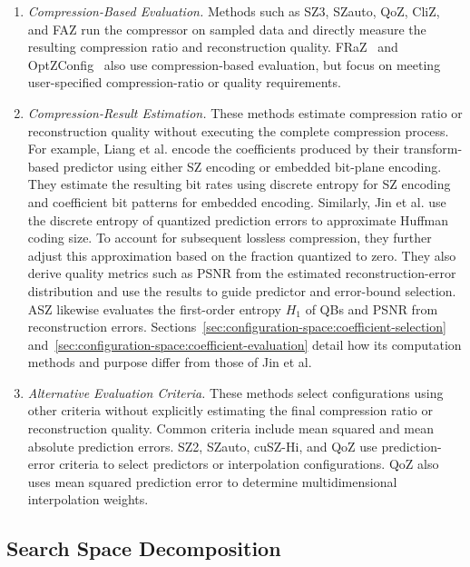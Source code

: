 \begin{enumerate}
\item \emph{Compression-Based Evaluation.} Methods such as SZ3, SZauto, QoZ, CliZ, and FAZ run the compressor on sampled data and directly measure the resulting compression ratio and reconstruction quality. FRaZ~\cite{underwood2020fraz} and OptZConfig~\cite{underwood2022optzconfig} also use compression-based evaluation, but focus on meeting user-specified compression-ratio or quality requirements.

\item \emph{Compression-Result Estimation.} These methods estimate compression ratio or reconstruction quality without executing the complete compression process. For example, Liang et al. encode the coefficients produced by their transform-based predictor using either SZ encoding or embedded bit-plane encoding. They estimate the resulting bit rates using discrete entropy for SZ encoding and coefficient bit patterns for embedded encoding. Similarly, Jin et al. use the discrete entropy of quantized prediction errors to approximate Huffman coding size. To account for subsequent lossless compression, they further adjust this approximation based on the fraction quantized to zero. They also derive quality metrics such as PSNR from the estimated reconstruction-error distribution and use the results to guide predictor and error-bound selection. ASZ likewise evaluates the first-order entropy $H_1$ of QBs and PSNR from reconstruction errors. Sections~\ref{sec:configuration-space:coefficient-selection} and~\ref{sec:configuration-space:coefficient-evaluation} detail how its computation methods and purpose differ from those of Jin et al.

\item \emph{Alternative Evaluation Criteria.} These methods select configurations using other criteria without explicitly estimating the final compression ratio or reconstruction quality. Common criteria include mean squared and mean absolute prediction errors. SZ2, SZauto, cuSZ-Hi, and QoZ use prediction-error criteria to select predictors or interpolation configurations. QoZ also uses mean squared prediction error to determine multidimensional interpolation weights.
\end{enumerate}

\subsection{Search Space Decomposition}
\label{sec:related-work:search}

